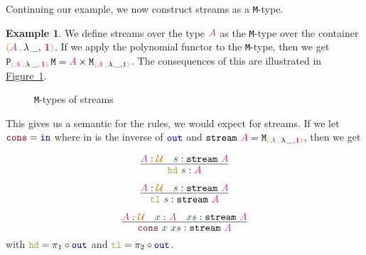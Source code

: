 \documentclass[twoside,11pt,openright]{report}
\theoremstyle{plain} %
\theoremstyle{definition}
\newtheorem{exmp}{Example} %
\theoremstyle{remark}
\newcommand*{\figref}[1]{\hyperref[fig:#1]{Figure~\ref*{fig:#1}}}
\newcommand*{\term}[1]{\textcolor{green!30!black}{#1}} %
\newcommand*{\type}[1]{\textcolor{magenta!90!black}{#1}}
\newcommand*{\containerpair}[2]{\ensuremath{\colorlet{savedleftcolor}{.}\color{orange}\left(\color{savedleftcolor}#1\,\textcolor{orange}{\mathbf{,}}\,#2\color{orange}\right)\color{savedleftcolor}}}
\newcommand*{\containerpairsimple}[2]{\containerpair{#1}{\lambda\,\_,\,#2}}
\newcommand*{\universe}[1]{\textcolor{orange!80!black}{#1}}
\newcommand*{\unit}{\type{\textbf{1}}}
\newcommand*{\function}[1]{\textcolor{blue!60!black}{\ensuremath{\mathtt{#1}}}}
\newcommand*{\constructor}[1]{\textcolor{purple!60!black}{\ensuremath{\mathtt{#1}}}}
\newcommand*{\destructor}[1]{\textcolor{yellow!60!black}{\ensuremath{\mathtt{#1}}}}
\newcommand*{\typeformer}[1]{\ensuremath{\mathtt{#1}}}
\newcommand*{\functor}[1]{\ensuremath{\mathbf{\mathtt{#1}}}}
\begin{document}
\noindent Continuing our example, we now construct streams as a \texttt{M}-type.
\begin{exmp}
  \label{exmp:stream-M-type-example}
  We define streams over the type \(\type{A}\) as the \texttt{M}-type over the container \(\containerpairsimple{\type{A}}{\unit}\). If we apply the polynomial functor to the \texttt{M}-type, then we get \(\functor{P}_{\containerpairsimple{\type{A}}{\unit}}\,\typeformer{M} = \type{A} \times \typeformer{M}_{\containerpair{\type{A}}{\lambda\,\_,\unit}}\). The consequences of this are illustrated in \figref{stream-M-type}.
  \begin{figure}[h]
    \centering
    \caption{\texttt{M}-types of streams}
    \label{fig:stream-M-type}
  \end{figure}
  This gives us a semantic for the rules, we would expect for streams. If we let \(\constructor{cons} = \function{in}\) where in is the inverse of \(\function{out}\) and \(\typeformer{stream}~\type{A} = \typeformer{M}_{\containerpair{\type{A}}{\lambda\,\_,\unit}}\), then we get
  \begin{center}
    \strut
    \hfill
    \begin{minipage}{0.4\linewidth}
      \begin{equation}
        \vcenter{\infer{\destructor{hd}~\term{s} : \type{A}}{\type{A} : \universe{\mathcal{U}} & \term{s} : \typeformer{stream}~\type{A}}}
      \end{equation}
    \end{minipage}
    \hfill
    \begin{minipage}{0.4\linewidth}
      \begin{equation}
        \vcenter{\infer{\destructor{tl}~\term{s} : \typeformer{stream}~\type{A}}{\type{A} : \universe{\mathcal{U}} & \term{s} : \typeformer{stream}~\type{A}}}
      \end{equation}
    \end{minipage}
    \hfill
    \strut
  \end{center}
  \begin{equation}
    \vcenter{\infer{\term{\constructor{cons}}~\term{x}~\term{xs} : \typeformer{stream}~\type{A}}{\type{A} : \universe{\mathcal{U}} & \term{x} : \type{A} & \term{xs} : \typeformer{stream}~\type{A}}}
  \end{equation}
  with \(\destructor{hd} = \pi_1 \circ \function{out}\) and \(\destructor{tl} = \pi_2 \circ \function{out}\).
\end{exmp}
\end{document}
